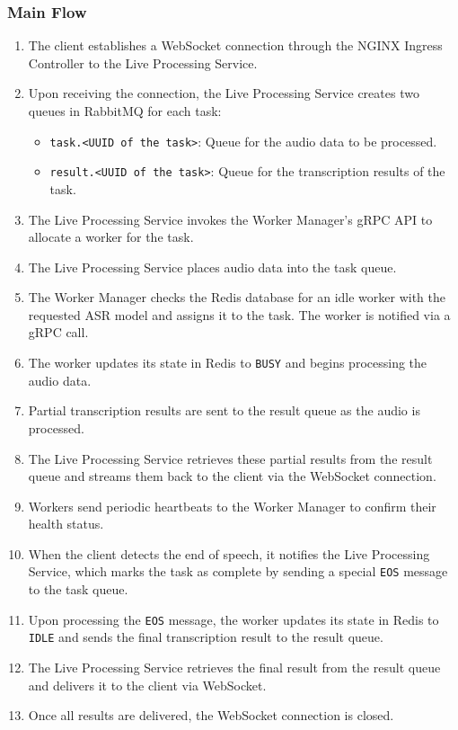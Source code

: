 \subsubsection{Main Flow}
\begin{enumerate}
    \item The client establishes a WebSocket connection through the NGINX Ingress Controller to the Live Processing Service.
    \item Upon receiving the connection, the Live Processing Service creates two queues in RabbitMQ for each task:
    \begin{itemize}
        \item \texttt{task.<UUID of the task>}: Queue for the audio data to be processed.
        \item \texttt{result.<UUID of the task>}: Queue for the transcription results of the task.
    \end{itemize} 
    \item The Live Processing Service invokes the Worker Manager’s gRPC API to allocate a worker for the task.
    \item The Live Processing Service places audio data into the task queue.
    \item The Worker Manager checks the Redis database for an idle worker with the requested ASR model and assigns it to the task. The worker is notified via a gRPC call.
    \item The worker updates its state in Redis to \texttt{BUSY} and begins processing the audio data.
    \item Partial transcription results are sent to the result queue as the audio is processed.
    \item The Live Processing Service retrieves these partial results from the result queue and streams them back to the client via the WebSocket connection.
    \item Workers send periodic heartbeats to the Worker Manager to confirm their health status.
    \item When the client detects the end of speech, it notifies the Live Processing Service, which marks the task as complete by sending a special \texttt{EOS} message to the task queue.
    \item Upon processing the \texttt{EOS} message, the worker updates its state in Redis to \texttt{IDLE} and sends the final transcription result to the result queue.
    \item The Live Processing Service retrieves the final result from the result queue and delivers it to the client via WebSocket.
    \item Once all results are delivered, the WebSocket connection is closed.
\end{enumerate}

